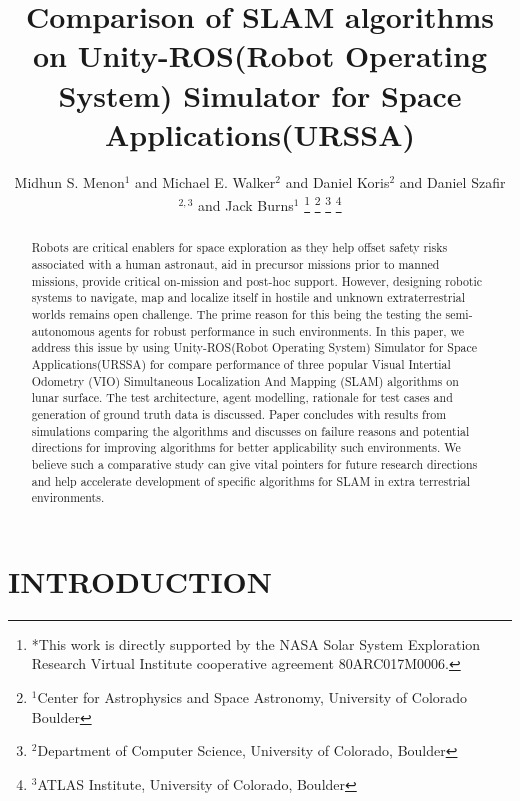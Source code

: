 \documentclass[a4paper, 10pt, conference]{ieeeconf}      %
\title{\LARGE \bf
Comparison of SLAM algorithms on Unity-ROS(Robot Operating System) Simulator for Space Applications(URSSA)
}
\author{Midhun S. Menon$^{1}$ and Michael E. Walker$^{2}$  and Daniel Koris$^{2}$ and Daniel Szafir$^{2,3}$ and Jack Burns$^{1}$%
\thanks{*This work is directly supported by the NASA Solar System Exploration Research Virtual Institute cooperative agreement 80ARC017M0006.}%
\thanks{$^{1}$Center for Astrophysics and Space Astronomy, University of Colorado Boulder}%
\thanks{$^{2}$Department of Computer Science, University of Colorado, Boulder}%
\thanks{$^{3}$ATLAS Institute, University of Colorado, Boulder}%
}
\begin{document}
\maketitle
\thispagestyle{empty}
\pagestyle{empty}


\begin{abstract}
Robots are critical enablers for space exploration as they help offset safety risks associated with a human astronaut, aid in precursor missions prior to manned missions, provide critical on-mission and post-hoc support. However, designing robotic systems to navigate, map and localize itself in hostile and unknown extraterrestrial worlds remains open challenge. The prime reason for this being the testing the semi-autonomous agents  for robust performance in such environments. In this paper, we address this issue by using Unity-ROS(Robot Operating System) Simulator for Space Applications(URSSA) for compare performance of three popular Visual Intertial Odometry (VIO) Simultaneous Localization And Mapping (SLAM) algorithms on lunar surface. The test architecture, agent modelling, rationale for test cases and generation of ground truth data is discussed. Paper concludes with results from simulations comparing the algorithms and discusses on failure reasons and potential directions for improving algorithms for better applicability such environments. We believe such a comparative study can give vital pointers for future research directions and help accelerate development of specific algorithms for SLAM in extra terrestrial environments.

\end{abstract}


\section{INTRODUCTION}
\end{document}
